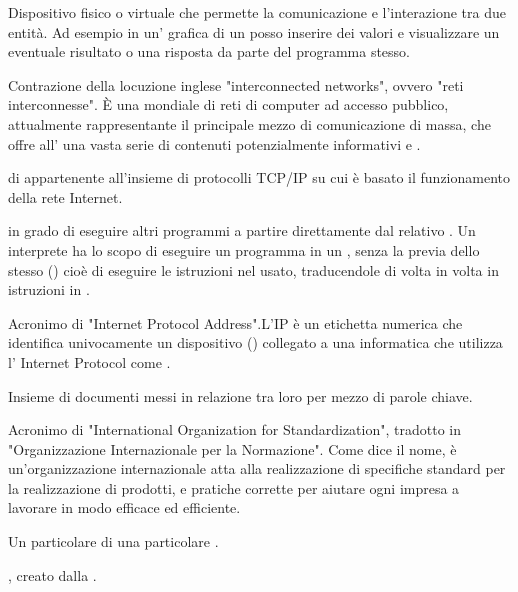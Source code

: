 {Dispositivo fisico o virtuale che permette la comunicazione e l'interazione tra due entità. Ad esempio in un' grafica di un  posso inserire dei valori  e visualizzare un eventuale risultato o una risposta da parte del programma stesso.}

{Contrazione della locuzione inglese "interconnected networks", ovvero "reti interconnesse".
\`{E} una  mondiale di reti di computer ad accesso pubblico, attualmente rappresentante il principale mezzo di comunicazione di massa, che offre all' una vasta serie di contenuti potenzialmente informativi e .}

{ di  appartenente all'insieme di protocolli  TCP/IP su cui è basato il funzionamento della rete Internet.}

{ in grado di eseguire altri programmi a partire direttamente dal relativo . Un interprete ha lo scopo di eseguire un programma in un , senza la previa  dello stesso () cioè di eseguire le istruzioni nel  usato, traducendole di volta in volta in istruzioni in .}

{Acronimo di "Internet Protocol Address".L'IP è un etichetta numerica che identifica univocamente un dispositivo () collegato a una  informatica che utilizza l' Internet Protocol come .}

{Insieme di documenti messi in relazione tra loro per mezzo di parole chiave.} 

{Acronimo di "International Organization for Standardization", tradotto in "Organizzazione Internazionale per la Normazione". Come dice il nome, è un'organizzazione internazionale atta alla realizzazione di specifiche standard per la realizzazione di prodotti,  e pratiche corrette per aiutare ogni impresa a lavorare in modo efficace ed efficiente.}

{Un particolare  di una particolare .}




{ , creato dalla .}


